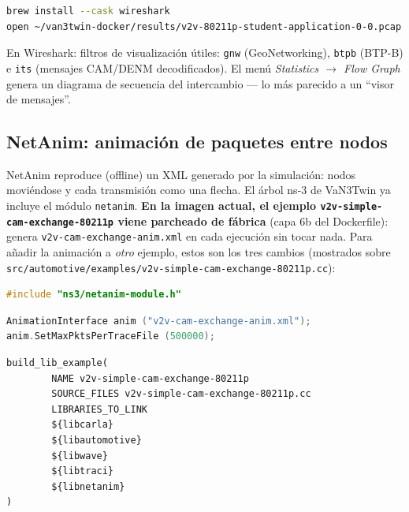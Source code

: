 \documentclass[11pt,a4paper]{article}
\begin{document}
\begin{lstlisting}[language=bash, caption={En el Mac}]
brew install --cask wireshark
open ~/van3twin-docker/results/v2v-80211p-student-application-0-0.pcap
\end{lstlisting}

En Wireshark: filtros de visualizaci\'on \'utiles: \texttt{gnw}
(GeoNetworking), \texttt{btpb} (BTP-B) e \texttt{its} (mensajes
CAM/DENM decodificados). El men\'u \emph{Statistics $\to$ Flow Graph}
genera un diagrama de secuencia del intercambio --- lo m\'as parecido a un
``visor de mensajes''.

\subsection{NetAnim: animaci\'on de paquetes entre nodos}
\label{sec:netanim}

NetAnim reproduce (offline) un XML generado por la simulaci\'on: nodos
movi\'endose y cada transmisi\'on como una flecha. El \'arbol ns-3 de
VaN3Twin ya incluye el m\'odulo \texttt{netanim}. \textbf{En la imagen
actual, el ejemplo \texttt{v2v-simple-cam-exchange-80211p} viene parcheado
de f\'abrica} (capa 6b del Dockerfile): genera
\texttt{v2v-cam-exchange-anim.xml} en cada ejecuci\'on sin tocar nada. Para
a\~nadir la animaci\'on a \emph{otro} ejemplo, estos son los tres cambios
(mostrados sobre
\texttt{src/automotive/examples/v2v-simple-cam-exchange-80211p.cc}):

\begin{lstlisting}[language=C++, caption={Cambio 1: junto al resto de \#include}]
#include "ns3/netanim-module.h"
\end{lstlisting}

\begin{lstlisting}[language=C++, caption={Cambio 2: justo ANTES de Simulator::Run() (l\'inea $\sim$362)}]
AnimationInterface anim ("v2v-cam-exchange-anim.xml");
anim.SetMaxPktsPerTraceFile (500000);
\end{lstlisting}

\begin{lstlisting}[caption={Cambio 3: enlazar el m\'odulo netanim en
src/automotive/examples/CMakeLists.txt (bloque del ejemplo, l\'inea
$\sim$125). Sin esto el enlace falla con \texttt{collect2: error: ld}.}]
build_lib_example(
        NAME v2v-simple-cam-exchange-80211p
        SOURCE_FILES v2v-simple-cam-exchange-80211p.cc
        LIBRARIES_TO_LINK
        ${libcarla}
        ${libautomotive}
        ${libwave}
        ${libtraci}
        ${libnetanim}
)
\end{lstlisting}
\end{document}
